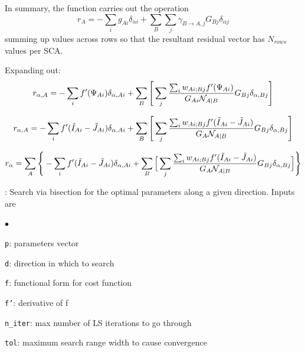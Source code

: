 \documentclass[12pt]{pasj01}
\newcommand{\Katherine}[1]{{\textcolor{ForestGreen}{\bfseries{[#1]}}}}
\begin{document}
In summary, the function carries out the operation
\begin{equation}
    r_{A} = - \sum_i g_{Ai} \delta_{\alpha i} 
     + \sum_{B}\sum_j \gamma_{B \to A,j} G_{Bj} \delta_{\alpha j}
\end{equation}
summing up values across rows so that the resultant residual vector has $N_{rows}$ values per SCA. 


Expanding out:
\begin{equation}
    r_{\alpha,A} = - \sum_i f'(\Psi_{Ai}) \delta_{\alpha, Ai} 
     + \sum_{B} \Bigg[\sum_{j} \frac{ \sum_i w_{Ai;Bj} f'(\Psi_{Ai})}{G_{Ai}{\cal N}_{A|B}} G_{Bj} \delta_{\alpha, Bj}\Bigg]
\end{equation}

\begin{equation}
    r_{\alpha,A} = - \sum_i f'(\tilde I_{Ai} - \tilde J_{Ai}) \delta_{\alpha, Ai} 
     + \sum_{B} \Bigg[\sum_{j} \frac{\sum_i w_{Ai;Bj} f'(\tilde I_{Ai} - \tilde J_{Ai})}{G_A{\cal N}_{A|B}} G_{Bj} \delta_{\alpha, Bj}\Bigg]
\end{equation}

\begin{equation}
    r_\alpha = \sum_A \Bigg\{ - \sum_i f'(\tilde I_{Ai} - \tilde J_{Ai}) \delta_{\alpha, Ai} 
     + \sum_{B} \Big[\sum_{j} \frac{\sum_i w_{Ai;Bj} f'(\tilde I_{Ai} - \tilde J_{Ai})}{G_A{\cal N}_{A|B}} G_{Bj} \delta_{\alpha, Bj}\Big]\Bigg\}
\end{equation}


\vskip 0.05in

: Search via bisection for the optimal parameters along a given direction. Inputs are
\begin{list}{$\bullet$}{}
\item {\tt p}: parameters vector
\item {\tt d}: direction in which to search
\item {\tt f}: functional form for cost function
\item{\tt f'}: derivative of f
\item {\tt n\_iter}: max number of LS iterations to go through
\item{\tt tol}: maximum search range width to cause convergence
\end{list}
\end{document}
